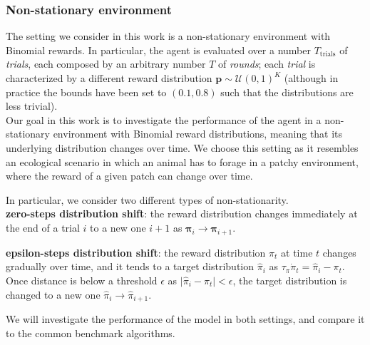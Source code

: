 \subsubsection{Non-stationary environment}
\noindent The setting we consider in this work is a non-stationary environment with Binomial rewards. In particular, the agent is evaluated over a number $T_{\text{trials}}$ of \textit{trials}, each composed by an arbitrary number $T$ of \textit{rounds}; each \textit{trial} is characterized by a different
reward distribution $\mathbf{p}\sim\mathcal{U}(0,1)^{K}$ (although in practice the bounds have been set to $(0.1, 0.8)$ such that the distributions are less trivial). \\
\noindent Our goal in this work is to investigate the performance of the agent in a non-stationary environment with Binomial reward distributions, meaning that its underlying distribution changes over time.
We choose this setting as it resembles an ecological scenario in which an animal has to forage in a patchy environment, where the reward of a given patch can change over time.

\noindent In particular, we consider two different types of non-stationarity.\\
\textbf{zero-steps distribution shift}: the reward distribution changes immediately at the end of a trial $i$ to a new one $i+1$ as $\mathbf{\pi}_{i} \to \mathbf{\pi}_{i+1}$.

\noindent \textbf{epsilon-steps distribution shift}: the reward distribution $\pi_{t}$ at time $t$ changes gradually over time, and it tends to a target distribution $\hat{\pi}_{i}$ as $\tau_{\pi}\dot{\pi}_{t}=\hat{\pi}_{i}-\pi_{t}$. Once distance is below a threshold $\epsilon$ as $\vert \hat{\pi}_{i} - \pi_{t}\vert < \epsilon$, the target distribution is changed to a new one $\hat{\pi}_{i}\to\hat{\pi}_{i+1}$.

We will investigate the performance of the model in both settings, and compare it to the common benchmark algorithms.




